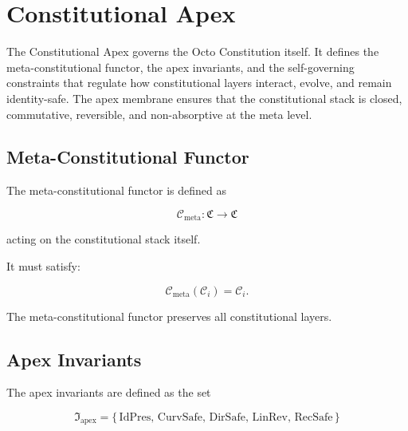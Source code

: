 
\section{Constitutional Apex}
\label{sec:constitutional-apex}

The Constitutional Apex governs the Octo Constitution itself. It defines the
meta-constitutional functor, the apex invariants, and the self-governing
constraints that regulate how constitutional layers interact, evolve, and
remain identity-safe. The apex membrane ensures that the constitutional stack
is closed, commutative, reversible, and non-absorptive at the meta level.


\subsection{Meta-Constitutional Functor}

The meta-constitutional functor is defined as

\[
\mathcal{C}_{\mathrm{meta}} :
\mathfrak{C} \to \mathfrak{C}
\]

acting on the constitutional stack itself.

It must satisfy:

\[
\mathcal{C}_{\mathrm{meta}}(\mathcal{C}_i) = \mathcal{C}_i.
\]

The meta-constitutional functor preserves all constitutional layers.


\subsection{Apex Invariants}

The apex invariants are defined as the set

\[
\mathfrak{I}_{\mathrm{apex}}
=
\{\,
\mathrm{IdPres},\,
\mathrm{CurvSafe},\,
\mathrm{DirSafe},\,
\mathrm{LinRev},\,
\mathrm{RecSafe}
\,\}
\]

